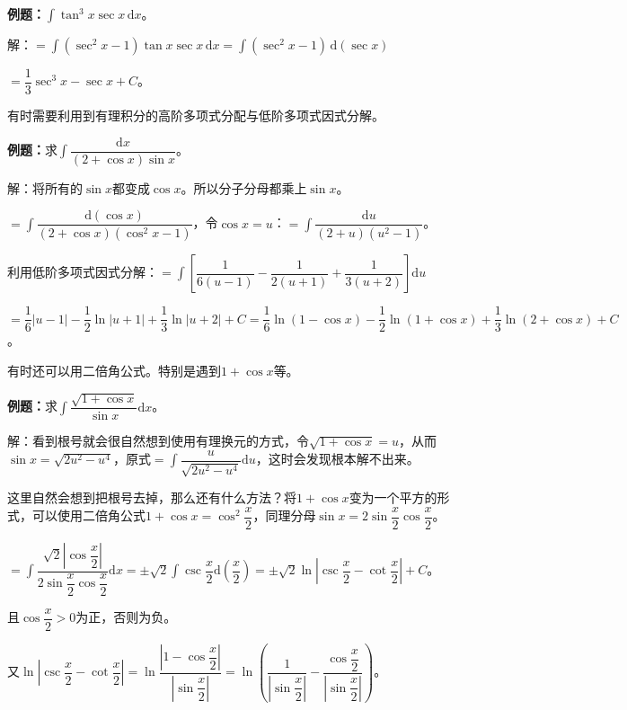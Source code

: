 \documentclass[UTF8, 12pt]{ctexart}
\begin{document}
\textbf{例题：}$\displaystyle{\int\tan^3x\sec x\,\textrm{d}x}$。

解：$=\displaystyle{\int(\sec^2x-1)}\tan x\sec x\,\textrm{d}x=\displaystyle{\int(\sec^2x-1)}\,\textrm{d}(\sec x)$

$=\dfrac{1}{3}\sec^3x-\sec x+C$。

有时需要利用到有理积分的高阶多项式分配与低阶多项式因式分解。

\textbf{例题：}求$\displaystyle{\int\dfrac{\textrm{d}x}{(2+\cos x)\sin x}}$。\medskip

解：将所有的$\sin x$都变成$\cos x$。所以分子分母都乘上$\sin x$。

$=\displaystyle{\int\dfrac{\textrm{d}(\cos x)}{(2+\cos x)(\cos^2x-1)}}$，令$\cos x=u$：$=\displaystyle{\int\dfrac{\textrm{d}u}{(2+u)(u^2-1)}}$。

利用低阶多项式因式分解：$=\displaystyle{\int\left[\dfrac{1}{6(u-1)}-\dfrac{1}{2(u+1)}+\dfrac{1}{3(u+2)}\right]\textrm{d}u}$

$=\dfrac{1}{6}\vert u-1\vert-\dfrac{1}{2}\ln\vert u+1\vert+\dfrac{1}{3}\ln\vert u+2\vert+C=\dfrac{1}{6}\ln(1-\cos x)-\dfrac{1}{2}\ln(1+\cos x)+\dfrac{1}{3}\ln(2+\cos x)+C$。

有时还可以用二倍角公式。特别是遇到$1+\cos x$等。\medskip

\textbf{例题：}求$\displaystyle{\int\dfrac{\sqrt{1+\cos x}}{\sin x}\textrm{d}x}$。

解：看到根号就会很自然想到使用有理换元的方式，令$\sqrt{1+\cos x}=u$，从而$\sin x=\sqrt{2u^2-u^4}$，原式$=\displaystyle{\int\dfrac{u}{\sqrt{2u^2-u^4}}\textrm{d}u}$，这时会发现根本解不出来。

这里自然会想到把根号去掉，那么还有什么方法？将$1+\cos x$变为一个平方的形式，可以使用二倍角公式$1+\cos x=\cos^2\dfrac{x}{2}$，同理分母$\sin x=2\sin\dfrac{x}{2}\cos\dfrac{x}{2}$。

$=\displaystyle{\int\dfrac{\sqrt{2}\left\vert\cos\dfrac{x}{2}\right\vert}{2\sin\dfrac{x}{2}\cos\dfrac{x}{2}}\textrm{d}x=\pm\sqrt{2}\int\csc\dfrac{x}{2}\textrm{d}\left(\dfrac{x}{2}\right)=\pm\sqrt{2}\ln\left\vert\csc\dfrac{x}{2}-\cot\dfrac{x}{2}\right\vert+C}$。

且$\cos\dfrac{x}{2}>0$为正，否则为负。

又$\ln\left\vert\csc\dfrac{x}{2}-\cot\dfrac{x}{2}\right\vert=\ln\dfrac{\left\vert1-\cos\dfrac{x}{2}\right\vert}{\left\vert\sin\dfrac{x}{2}\right\vert}=\ln\left(\dfrac{1}{\left\vert\sin\dfrac{x}{2}\right\vert}-\dfrac{\cos\dfrac{x}{2}}{\left\vert\sin\dfrac{x}{2}\right\vert}\right)$。\medskip
\end{document}
